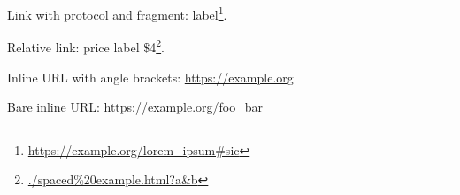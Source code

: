 Link with protocol and fragment: label\footnote{\url{https://example.org/lorem_ipsum\#sic}}.

Relative link: price label \$4\footnote{\url{./spaced\%20example.html?a&b}}.

Inline URL with angle brackets: \url{https://example.org}

Bare inline URL: \url{https://example.org/foo_bar}


